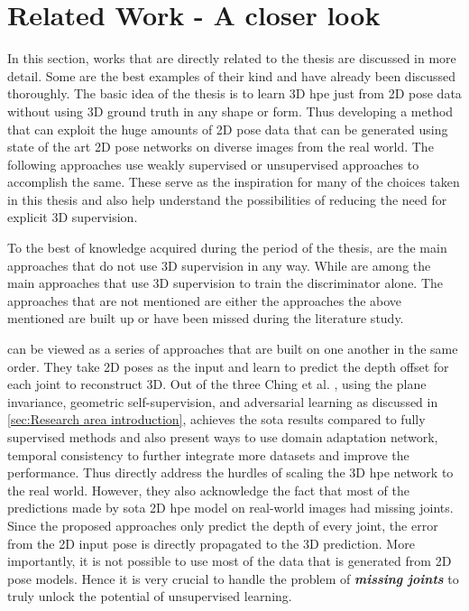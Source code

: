 
\section{Related Work - A closer look}
\label{section:Related Work}

In this section, works that are directly related to the thesis are discussed in more detail. Some are the best examples of their kind and have already been discussed thoroughly. The basic idea of the thesis is to learn 3D \ac{hpe} just from 2D pose data without using 3D ground truth in any shape or form. Thus developing a method that can exploit the huge amounts of 2D pose data that can be generated using state of the art 2D pose networks on diverse images from the real world. The following approaches use weakly supervised or unsupervised approaches to accomplish the same. These serve as the inspiration for many of the choices taken in this thesis and also help understand the possibilities of reducing the need for explicit 3D supervision.

To the best of knowledge acquired during the period of the thesis, \cite{can3dpose, amazon1, unsupervisedAdversarial, c3dpo} are the main approaches that do not use 3D supervision in any way. While \cite{repnet, weaklymultiple} are among the main approaches that use 3D supervision to train the discriminator alone. The approaches that are not mentioned are either the approaches the above mentioned are built up or have been missed during the literature study.

\cite{unsupervisedAdversarial, can3dpose, amazon1} can be viewed as a series of approaches that are built on one another in the same order. They take 2D poses as the input and learn to predict the depth offset for each joint to reconstruct 3D. Out of the three Ching et al. \cite{amazon1}, using the plane invariance, geometric self-supervision, and adversarial learning as discussed in \ref{sec:Research area introduction}, achieves the \ac{sota} results compared to fully supervised methods and also present ways to use domain adaptation network, temporal consistency to further integrate more datasets and improve the performance. Thus directly address the hurdles of scaling the 3D \ac{hpe} network to the real world. However, they also acknowledge the fact that most of the predictions made by \ac{sota} 2D \ac{hpe} model on real-world images had missing joints. Since the proposed approaches only predict the depth of every joint, the error from the 2D input pose is directly propagated to the 3D prediction. More importantly, it is not possible to use most of the data that is generated from 2D pose models. Hence it is very crucial to handle the problem of \textit{\textbf{missing joints}} to truly unlock the potential of unsupervised learning. 

